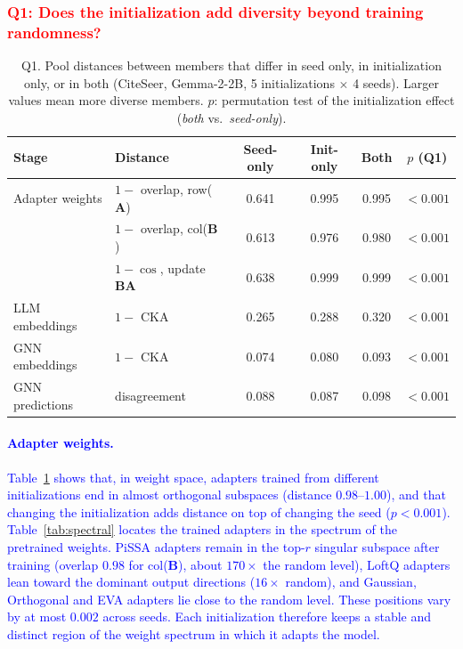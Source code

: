 \documentclass[a4paper,fleqn]{cas-sc}
\newcommand{\revone}[1]{\textcolor{red}{#1}}   %
\newcommand{\revtwo}[1]{\textcolor{blue}{#1}}  %
\begin{document}
\subsubsection{\revone{Q1: Does the initialization add diversity beyond training randomness?}}\label{sec:initQ1}

\begin{table}[t]
\centering\color{red}
\caption{Q1. Pool distances between members that differ in seed only, in initialization only, or in both (CiteSeer, Gemma-2-2B, 5 initializations $\times$ 4 seeds). Larger values mean more diverse members. $p$: permutation test of the initialization effect (\emph{both} vs.\ \emph{seed-only}).}
\label{tab:seed_vs_init}
\small
\begin{tabular*}{\textwidth}{@{\extracolsep{\fill}} llcccc @{}}
\toprule
\textbf{Stage} & \textbf{Distance} & \textbf{Seed-only} & \textbf{Init-only} & \textbf{Both} & \textbf{$p$ (Q1)} \\
\midrule
Adapter weights & $1-$ overlap, row($\mathbf{A}$) & 0.641 & 0.995 & 0.995 & $<0.001$ \\
                & $1-$ overlap, col($\mathbf{B}$) & 0.613 & 0.976 & 0.980 & $<0.001$ \\
                & $1-\cos$, update $\mathbf{B}\mathbf{A}$ & 0.638 & 0.999 & 0.999 & $<0.001$ \\
\midrule
LLM embeddings  & $1-$ CKA & 0.265 & 0.288 & 0.320 & $<0.001$ \\
GNN embeddings  & $1-$ CKA & 0.074 & 0.080 & 0.093 & $<0.001$ \\
GNN predictions & disagreement & 0.088 & 0.087 & 0.098 & $<0.001$ \\
\bottomrule
\end{tabular*}
\end{table}

\paragraph{\revtwo{Adapter weights.}}
\revtwo{Table~\ref{tab:seed_vs_init} shows that, in weight space, adapters trained from different initializations end in almost orthogonal subspaces (distance $0.98$--$1.00$), and that changing the initialization adds distance on top of changing the seed ($p<0.001$). Table~\ref{tab:spectral} locates the trained adapters in the spectrum of the pretrained weights. PiSSA adapters remain in the top-$r$ singular subspace after training (overlap $0.98$ for col($\mathbf{B}$), about $170\times$ the random level), LoftQ adapters lean toward the dominant output directions ($16\times$ random), and Gaussian, Orthogonal and EVA adapters lie close to the random level. These positions vary by at most $0.002$ across seeds. Each initialization therefore keeps a stable and distinct region of the weight spectrum in which it adapts the model.}
\end{document}
